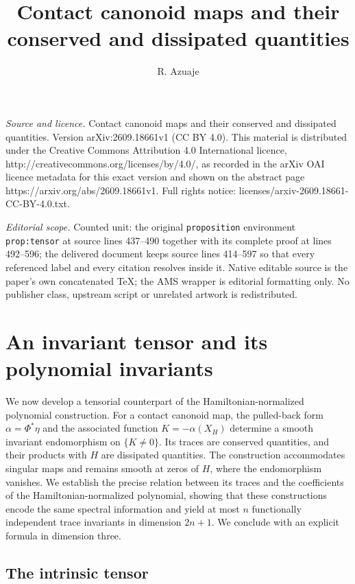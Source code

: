 \documentclass[10pt,a4paper]{amsart}
\numberwithin{equation}{section}
\begin{document}
\title[Contact canonoid maps and their conserved and dissipated qua]{Contact canonoid maps and their conserved and dissipated quantities}
\author{R. Azuaje}
\date{}
\maketitle
\noindent\emph{Source and licence.} Contact canonoid maps and their conserved and dissipated quantities. Version arXiv:2609.18661v1 (CC BY 4.0). This material is distributed under the Creative Commons Attribution 4.0 International licence, http://creativecommons.org/licenses/by/4.0/, as recorded in the arXiv OAI licence metadata for this exact version and shown on the abstract page https://arxiv.org/abs/2609.18661v1. Full rights notice: licenses/arxiv-2609.18661-CC-BY-4.0.txt.\par\smallskip
\noindent\textit{Editorial scope.} Counted unit: the original \texttt{proposition} environment \texttt{prop:tensor} at source lines 437--490 together with its complete proof at lines 492--596; the delivered document keeps source lines 414--597 so that every referenced label and every citation resolves inside it. Native editable source is the paper's own concatenated TeX; the AMS wrapper is editorial formatting only. No publisher class, upstream script or unrelated artwork is redistributed.
\section{An invariant tensor and its polynomial invariants}
\label{sec:tensor}

We now develop a tensorial counterpart of the
Hamiltonian-normalized polynomial construction.
For a contact canonoid map, the pulled-back form
$\alpha=\Phi^*\eta$ and the associated function
$K=-\alpha(X_H)$ determine a smooth invariant endomorphism
on $\{K\neq0\}$. Its traces are conserved quantities,
and their products with $H$ are dissipated quantities.
The construction accommodates singular maps and remains
smooth at zeros of $H$, where the endomorphism vanishes.
We establish the precise relation between its traces and
the coefficients of the Hamiltonian-normalized polynomial,
showing that these constructions encode the same spectral
information and yield at most $n$ functionally independent
trace invariants in dimension $2n+1$. We conclude with an
explicit formula in dimension three.



\subsection{The intrinsic tensor}
\end{document}
